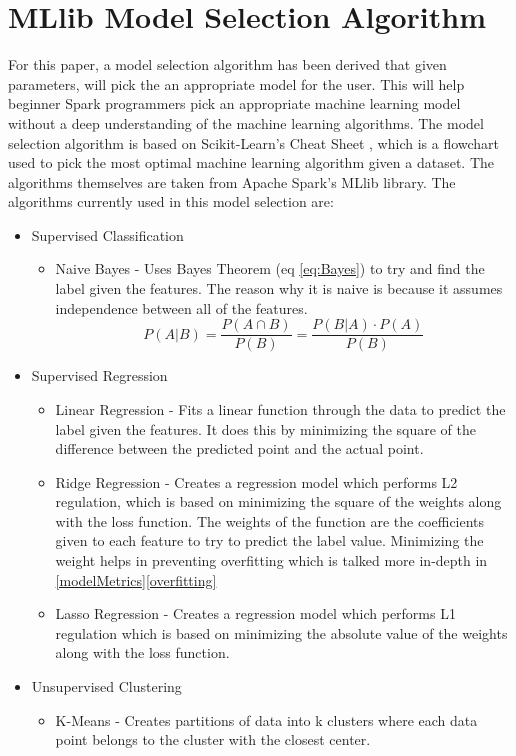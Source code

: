 \documentclass[9pt,twocolumn,twoside]{idsi}
\begin{document}
\section{MLlib Model Selection Algorithm} \label{algo}
For this paper, a model selection algorithm has been derived that given parameters, will pick the an appropriate model for the user. This will help beginner Spark programmers pick an appropriate machine learning model without a deep understanding of the machine learning algorithms. The model selection algorithm is based on Scikit-Learn's Cheat Sheet \cite{scikit_learn}, which is a flowchart used to pick the most optimal machine learning algorithm given a dataset. The algorithms themselves are taken from Apache Spark's MLlib library. The algorithms currently used in this model selection are:

\begin{itemize}
\item Supervised Classification
	\begin{itemize}
	\item Naive Bayes - Uses Bayes Theorem (eq \ref{eq:Bayes}) to try and find the label given the features. The reason why it is naive is because it assumes independence between all of the features.
    \begin{equation}
    P(A|B) =\frac{P(A \cap B)}{P(B)} = \frac{P(B|A) \cdot P(A)}{P(B)}
    \label{eq:Bayes}
    \end{equation}
	\end{itemize}
\item Supervised Regression
	\begin{itemize}
	\item Linear Regression - Fits a linear function through the data to predict the label given the features. It does this by minimizing the square of the difference between the predicted point and the actual point.
    \item Ridge Regression  - Creates a regression model which performs L2 regulation, which is based on minimizing the square of the weights along with the loss function. The weights of the function are the coefficients given to each feature to try to predict the label value. Minimizing the weight helps in preventing overfitting which is talked more in-depth in \ref{modelMetrics}\ref{overfitting}
    \item Lasso Regression - Creates a regression model which performs L1 regulation which is based on minimizing the absolute value of the weights along with the loss function.
	\end{itemize}
\item Unsupervised Clustering
	\begin{itemize}
	\item K-Means - Creates partitions of data into k clusters where each data point belongs to the cluster with the closest center.
	\end{itemize}
\end{itemize}
\end{document}
